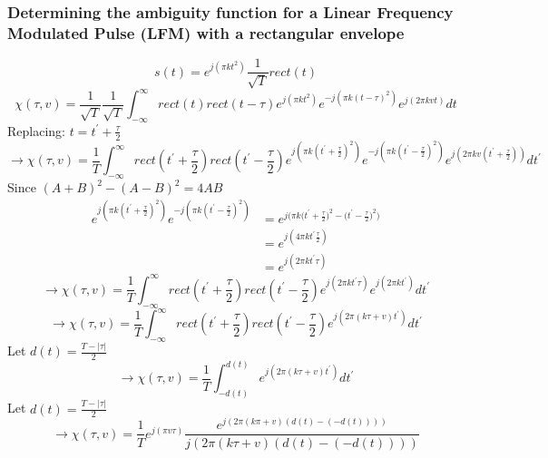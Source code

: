 \subsubsection*{Determining the ambiguity function for a Linear Frequency Modulated Pulse (LFM) with a rectangular envelope} 
\begin{equation*} 
s(t) = e^{j(\pi k t^2)} \frac{1}{\sqrt{T}} rect(t) 
\end{equation*}
\begin{equation*} 
\chi(\tau,v) =  \frac{1}{\sqrt{T}} \frac{1}{\sqrt{T}} \int_{-\infty}^{\infty} rect(t) rect(t-\tau) e^{j(\pi kt^2)} e^{-j(\pi k {(t-\tau)}^2)}e^{j(2\pi kvt)} dt
\end{equation*}
\noindent Replacing: $ t = t^{'} + \frac{\tau}{2}$
\begin{equation*} 
\rightarrow \chi(\tau,v) =  \frac{1}{T} \int_{-\infty}^{\infty} rect(t^{'} + \frac{\tau}{2}) rect(t^{'} - \frac{\tau}{2}) e^{j(\pi k({t^{'} + \frac{\tau}{2}})^2)} e^{-j(\pi k {(t^{'} - \frac{\tau}{2})}^2)} e^{j(2\pi kv(t^{'}+\frac{\tau}{2}))} dt^{'}
\end{equation*}
\noindent Since ${(A+B)}^{2} - {(A-B)}^{2} = 4AB$
\begin{equation} 
\begin{split}
e^{j(\pi k({t^{'} + \frac{\tau}{2}})^2)}e^{-j(\pi k {(t^{'} - \frac{\tau}{2})}^2)} & = e^{j\Big(\pi k {(t^{'} + \frac{\tau}{2}})^{2} - {(t^{'} - \frac{\tau}{2}})^{2} \Big)}\\
& = e^{j(4\pi k t^{'} \frac{\tau}{2})} \\
& = e^{j(2\pi k t^{'} \tau)}
\end{split}
\end{equation}
\begin{equation*} 
\rightarrow \chi(\tau,v) =  \frac{1}{T} \int_{-\infty}^{\infty} rect(t^{'}+\frac{\tau}{2}) rect(t^{'}-\frac{\tau}{2}) e^{j(2\pi k t^{'} \tau)} e^{j(2\pi k t^{'})} dt^{'}
\end{equation*}
\begin{equation*} 
\rightarrow \chi(\tau,v) =  \frac{1}{T} \int_{-\infty}^{\infty} rect(t^{'}+\frac{\tau}{2}) rect(t^{'}-\frac{\tau}{2}) e^{j(2\pi (k\tau+v) t^{'})}  dt^{'}
\end{equation*}
\noindent Let $d(t) = \frac{T - |\tau|}{2}$
\begin{equation*} 
\rightarrow \chi(\tau,v) =  \frac{1}{T} \int_{-d(t)}^{d(t)} e^{j(2\pi (k\tau+v) t^{'})}  dt^{'}
\end{equation*}
\noindent Let $d(t) = \frac{T - |\tau|}{2}$
\begin{equation*} 
\rightarrow \chi(\tau,v) =  \frac{1}{T} e^{j(\pi v\tau)} \frac{e^{j(2\pi(k\pi + v)(d(t) - (-d(t))))}}{j(2\pi(k\tau + v)(d(t) - (-d(t))))}
\end{equation*}
